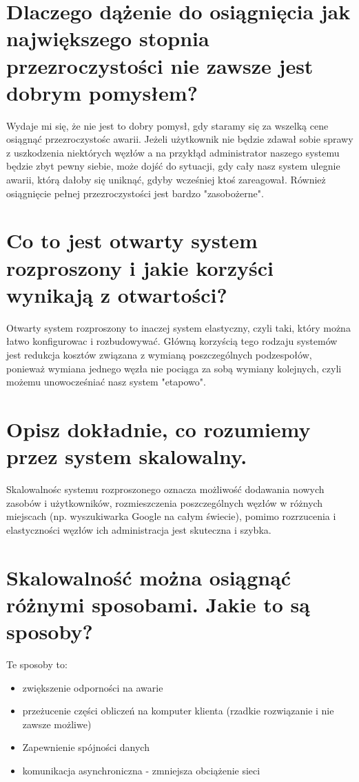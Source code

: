 \documentclass[10pt,a4paper]{article}
\begin{document}
\section{\normalsize{Dlaczego dążenie do osiągnięcia jak największego stopnia przezroczystości nie zawsze jest dobrym pomysłem?}}
Wydaje mi się, że nie jest to dobry pomysł, gdy staramy się za wszelką cene osiągnąć przezroczystośc awarii. Jeżeli użytkownik nie będzie zdawał sobie sprawy z uszkodzenia niektórych węzłów a na przykłąd administrator naszego systemu będzie zbyt pewny siebie, może dojść do sytuacji, gdy cały nasz system ulegnie awarii, którą dałoby się uniknąć, gdyby wcześniej ktoś zareagował. Również osiągnięcie pełnej przezroczystości jest bardzo "zasobożerne".
\section{\normalsize{Co to jest otwarty system rozproszony i jakie korzyści wynikają z otwartości?}}
Otwarty system rozproszony to inaczej system elastyczny, czyli taki, który można łatwo konfigurowac i rozbudowywać.
Główną korzyścią tego rodzaju systemów jest redukcja kosztów związana z wymianą poszczególnych podzespołów, ponieważ wymiana jednego węzła nie pociąga za sobą wymiany kolejnych, czyli możemu unowocześniać nasz system "etapowo".
\section{\normalsize{Opisz dokładnie, co rozumiemy przez system skalowalny.}}
Skalowalnośc systemu rozproszonego oznacza możliwość dodawania nowych zasobów i użytkowników, rozmieszczenia poszczególnych węzłów w różnych miejscach (np. wyszukiwarka Google na całym świecie), pomimo rozrzucenia i elastyczności węzłów ich administracja jest skuteczna i szybka.
\section{\normalsize{Skalowalność można osiągnąć różnymi sposobami. Jakie to są sposoby?}} 
Te sposoby to:
\begin{itemize}
\item{zwiększenie odporności na awarie}
\item{przeżucenie części obliczeń na komputer klienta (rzadkie rozwiązanie i nie zawsze możliwe)}
\item{Zapewnienie spójności danych}
\item{komunikacja asynchroniczna - zmniejsza obciążenie sieci}
\end{itemize}
\end{document}
